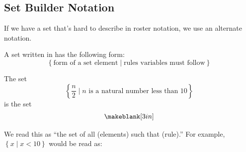 \subsection{Set Builder Notation} 
If we have a set that's hard to describe in roster notation, we use an alternate notation.
\begin{definition}
A set written in  has the following form:
\[
\left\{\mbox{form of a set element} \mid \mbox{rules variables must follow}\right\}
\]
\end{definition}
\begin{Example}
The set
\[
\left\{
\frac{n}{2}
\mid
n\mbox{ is a natural number less than 10}
\right\}
\]
is the set
\[
\makeblank[3in]
\]
\end{Example}
\begin{Note}
We read this as ``the set of all (elements) such that (rule).'' For example, $\left\{x\mid x<10\right\}$ would be read as:\makeblanknew
\end{Note}
